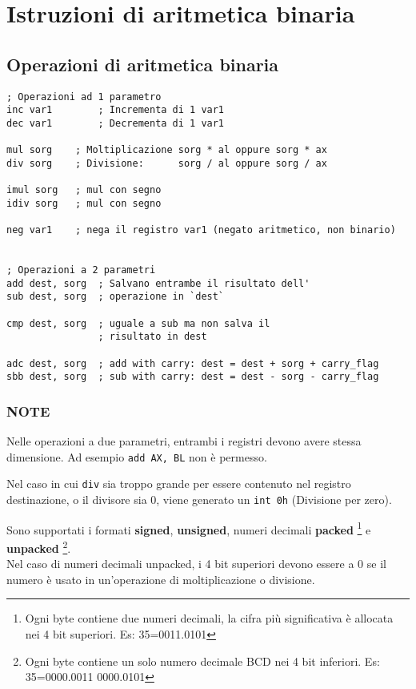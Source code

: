 \documentclass[../template]{subfiles}
\begin{document}
\section{Istruzioni di aritmetica binaria}
\subsection{Operazioni di aritmetica binaria}
\begin{lstlisting}
; Operazioni ad 1 parametro
inc var1        ; Incrementa di 1 var1
dec var1        ; Decrementa di 1 var1

mul sorg    ; Moltiplicazione sorg * al oppure sorg * ax
div sorg    ; Divisione:      sorg / al oppure sorg / ax

imul sorg   ; mul con segno
idiv sorg   ; mul con segno

neg var1    ; nega il registro var1 (negato aritmetico, non binario)


; Operazioni a 2 parametri
add dest, sorg  ; Salvano entrambe il risultato dell'
sub dest, sorg  ; operazione in `dest`

cmp dest, sorg  ; uguale a sub ma non salva il
                ; risultato in dest

adc dest, sorg  ; add with carry: dest = dest + sorg + carry_flag
sbb dest, sorg  ; sub with carry: dest = dest - sorg - carry_flag
\end{lstlisting}
\subsubsection{NOTE}
Nelle operazioni a due parametri, entrambi i registri devono avere
stessa dimensione. Ad esempio \lstinline{add AX, BL} non è permesso.

\vspace{10pt}
\noindent
Nel caso in cui \lstinline{div} sia troppo grande per essere contenuto nel
registro destinazione, o il divisore sia 0, viene generato un \lstinline{int 0h} (Divisione per zero).

\vspace{10pt}
\noindent
Sono supportati i formati \textbf{signed}, \textbf{unsigned}, numeri decimali \textbf{packed} \footnote{Ogni byte contiene due numeri decimali, la cifra più significativa è allocata nei 4 bit superiori. Es: 35=0011.0101} e \textbf{unpacked}
\footnote{Ogni byte contiene un solo numero decimale BCD nei 4 bit inferiori. Es: 35=0000.0011 0000.0101}.
\\
Nel caso di numeri decimali unpacked, i 4 bit superiori devono essere a 0 se il numero è usato in un'operazione di moltiplicazione o divisione.
\end{document}
